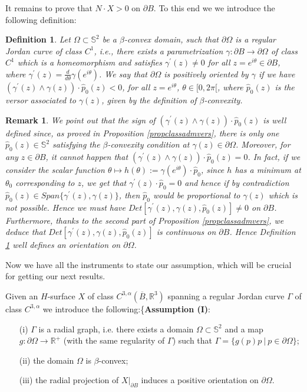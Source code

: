 \documentclass[a4paper,reqno,10pt,oneside]{amsart}
\numberwithin{equation}{section}
\newtheorem{remark}[theorem]{Remark}
\newtheorem{definition}[theorem]{Definition}
\begin{document}
It remains to prove that $N \cdot X>0$ on $\partial B$. To this end we we introduce the following definition:

\begin{definition}\label{definitposorjc}
Let $\Omega \subset \mathbb{S}^2$ be a $\beta$-convex domain, such that $\partial \Omega$ is a regular Jordan curve of class $C^{1}$, i.e., there exists a parametrization $\gamma\colon\partial B \to \partial \Omega$ of class $C^1$ which is a homeomorphism and satisfies $\gamma^\prime(z)\neq 0$ for all $z=e^{i \theta} \in \partial B$, where $\gamma^\prime(z)=\frac{d}{d\theta} \gamma(e^{i\theta})$. We say that $\partial \Omega$ is positively oriented by $\gamma$ if we have $(\gamma^\prime(z) \wedge \gamma(z)) \cdot \hat p_0(z) <0$, for all $z=e^{i\theta}$, $\theta \in [0,2\pi[$, where $\hat p_0(z)$ is the versor associated to $\gamma(z)$, given by the definition of $\beta$-convexity.
\end{definition}

\begin{remark}\label{remarkposorient}
We point out that the sign of $(\gamma^\prime(z) \wedge \gamma(z)) \cdot \hat p_0(z)$ is well defined since, as proved in Proposition \ref{propclassadmvers}, there is only one  $\hat p_0(z) \in \mathbb{S}^2$ satisfying the $\beta$-convexity condition at $\gamma(z) \in \partial \Omega$. Moreover, for any $z\in \partial B$, it cannot happen that $(\gamma^\prime(z) \wedge \gamma(z)) \cdot \hat p_0(z) =0$.  In fact, if we consider the scalar function $\theta \mapsto  h(\theta):=\gamma(e^{i \theta}) \cdot \hat p_0$, since $h$ has a minimum at $\theta_0$ corresponding to $z$, we get that $\gamma^\prime(z) \cdot \hat p_0=0$ and hence if by contradiction $\hat p_0(z) \in Span \{\gamma^\prime(z), \gamma(z)\}$, then $\hat p_0$ would be proportional to $\gamma(z)$ which is not possible. Hence we must have $Det [\gamma^\prime(z), \gamma(z), \hat p_0(z)] \neq 0$ on $\partial B$. Furthermore, thanks to the second part of Proposition \ref{propclassadmvers}, we deduce that $Det [\gamma^\prime(z), \gamma(z), \hat p_0(z)]$ is continuous on $\partial B$. Hence Definition \ref{definitposorjc} well defines an orientation on $\partial \Omega$. 
\end{remark}

Now we have all the instruments to state our assumption, which will be crucial for getting our next results. 

Given an $H$-surface $X$ of class $C^{3,\alpha}(\overline{B}, {\mathbb R}^3)$ spanning a regular Jordan curve $\Gamma$ of class $C^{3,\alpha}$ we introduce the following:\{\left[}4pt]
\textbf{Assumption (I)}:
\begin{itemize}
\item[(i)] $\Gamma$ is a radial graph, i.e. there exists a domain $\Omega\subset\mathbb{S}^{2}$ and a map $g\colon\partial\Omega\to{\mathbb R}^{+}$ (with the same regularity of $\Gamma$) such that $\Gamma=\{g(p)p~|~p\in\partial\Omega\}$;
\item[(ii)] the domain $\Omega$ is $\beta$-convex;
\item[(iii)] the radial projection of $X|_{\partial B}$ induces a positive orientation on $\partial\Omega$.
\end{itemize} 
 
\end{document}
